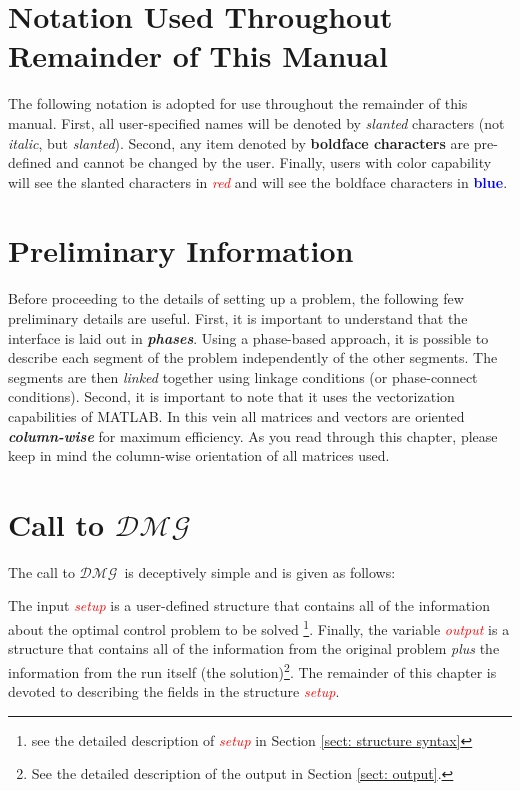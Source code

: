 \documentclass[10pt,final]{report}
\newcommand{\dmg}{$\mathcal{DMG}$~}
\newcommand{\bfblue}[1]{\textcolor{blue}{\bf #1}}
\newcommand{\slred}[1]{\textcolor{red}{\sl #1}}
\begin{document}
\section{Notation Used Throughout Remainder of This Manual}

The following notation is adopted for use throughout the remainder of this
manual.  First, all user-specified names will be denoted by {\sl slanted}
characters (not {\em italic}, but {\sl slanted}).  Second, any item denoted by
{\bf boldface characters}  are pre-defined and cannot be changed by the user.
Finally, users with color capability will see the slanted characters in
\slred{red} and will see the boldface characters in \bfblue{blue}.

\section{Preliminary Information}

Before proceeding to the details of setting up a problem, the following few preliminary details are useful.  First,
it is important to understand that the interface is laid
out in {\bf\em phases}.  Using a phase-based approach, it is possible
to describe each segment of the problem independently of the other
segments.  The segments are then {\em linked} together using linkage
conditions (or phase-connect conditions).  Second, it is important to
note that it uses the vectorization capabilities of MATLAB.
In this vein all matrices and vectors are oriented
{\bf\em column-wise} for maximum efficiency.  As you read through this
chapter, please keep in mind the column-wise orientation of all
matrices used.

\section{Call to \dmg}

The call to \dmg is deceptively simple and is given as follows:
\begin{center}
\end{center}
The input \slred{setup} is a user-defined structure that contains all
of the information about the optimal control problem to be solved
\footnote{see the detailed description of \slred{setup} in Section
\ref{sect: structure syntax}}.  Finally, the variable
\slred{output} is a structure that contains all of the information
from the original problem {\em plus} the information from the run
itself (\ie the solution)\footnote{See the detailed description of the
  output in Section \ref{sect: output}.}.  The remainder of this
chapter is devoted to describing the fields in the structure \slred{setup}.
\end{document}
